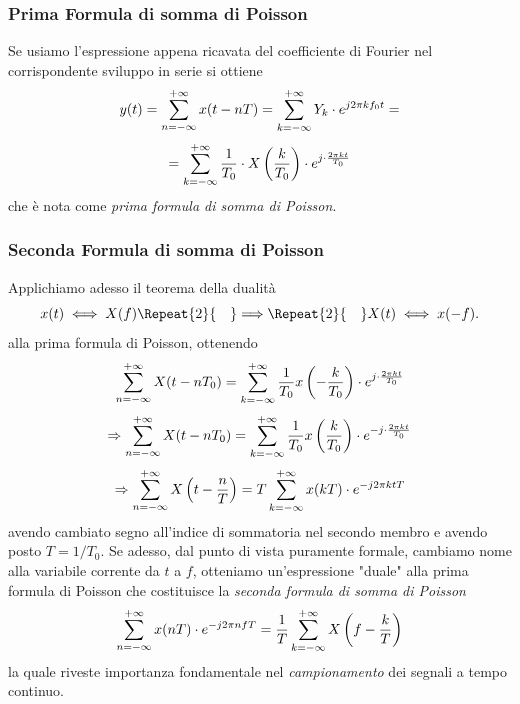 \documentclass[12pt,oneside,openany]{memoir}
\numberwithin{equation}{subsection}
\newcommand{\quads}[1]{\Repeat{#1}{\quad}}
\begin{document}

\subsubsection{Prima Formula di somma di Poisson}

Se usiamo l'espressione appena ricavata del coefficiente di Fourier nel
corrispondente sviluppo in serie si ottiene
\[
    y(t) = \sum\displaylimits_{n = -\infty}^{+\infty} x(t - nT) =
    \sum\displaylimits_{k = -\infty}^{+\infty} Y_k \cdot e^{j 2 \pi k f_0 t} =
\]
\[
    = \sum\displaylimits_{k = -\infty}^{+\infty} \frac{1}{T_0} \cdot
    X\left(\frac{k}{T_0}\right) \cdot e^{j \cdot \frac{2 \pi k t}{T_0}}
\]
che \`e nota come \textit{prima formula di somma di Poisson}.


\subsubsection{Seconda Formula di somma di Poisson}

Applichiamo adesso il teorema della dualit\`a
\[
    x(t) \iff X(f) \quads{2} \Longrightarrow \quads{2} X(t) \iff x(-f).
\]
alla prima formula di Poisson, ottenendo
\[
    \sum\displaylimits_{n = -\infty}^{+\infty} X(t - nT_0) =
    \sum\displaylimits_{k = -\infty}^{+\infty} \frac{1}{T_0}
    x\left(-\frac{k}{T_0}\right) \cdot e^{j \cdot \frac{2 \pi k t}{T_0}}
\]
\[
    \Rightarrow \sum\displaylimits_{n = -\infty}^{+\infty} X(t - nT_0) =
    \sum\displaylimits_{k = -\infty}^{+\infty} \frac{1}{T_0}
    x\left(\frac{k}{T_0}\right) \cdot e^{-j \cdot \frac{2 \pi k t}{T_0}}
\]
\[
    \Rightarrow \sum\displaylimits_{n = -\infty}^{+\infty} X\left(t -
    \frac{n}{T}\right) = T \sum\displaylimits_{k = -\infty}^{+\infty}
    x(kT) \cdot e^{-j 2 \pi k t T}
\]
avendo cambiato segno all'indice di sommatoria nel secondo membro e avendo posto
$T = 1/T_0$. Se adesso, dal punto di vista puramente formale, cambiamo nome alla
variabile corrente da $t$ a $f$, otteniamo un'espressione "duale" alla prima
formula di Poisson che costituisce la \textit{seconda formula di somma di
Poisson}
\[
    \sum\displaylimits_{n = -\infty}^{+\infty} x(nT) \cdot e^{-j 2 \pi n f T} =
    \frac{1}{T} \sum\displaylimits_{k = -\infty}^{+\infty} X\left(f -
    \frac{k}{T}\right)
\]
la quale riveste importanza fondamentale nel \textit{campionamento} dei segnali
a tempo continuo.
\end{document}
